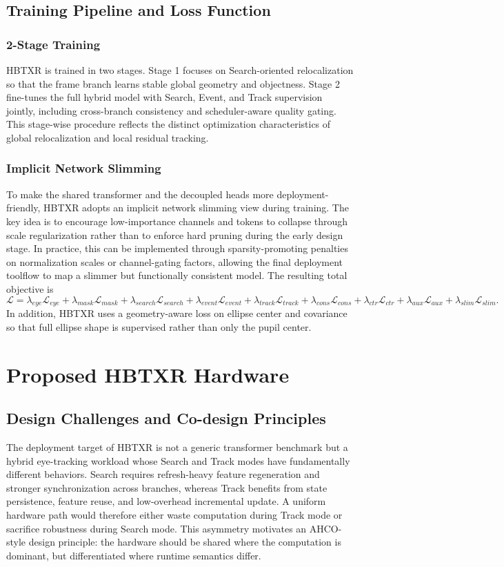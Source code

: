 \documentclass[journal]{IEEEtran}
\begin{document}
\subsection{Training Pipeline and Loss Function}
\subsubsection{2-Stage Training}
HBTXR is trained in two stages. Stage 1 focuses on Search-oriented relocalization so that the frame branch learns stable global geometry and objectness. Stage 2 fine-tunes the full hybrid model with Search, Event, and Track supervision jointly, including cross-branch consistency and scheduler-aware quality gating. This stage-wise procedure reflects the distinct optimization characteristics of global relocalization and local residual tracking.

\subsubsection{Implicit Network Slimming}
To make the shared transformer and the decoupled heads more deployment-friendly, HBTXR adopts an implicit network slimming view during training. The key idea is to encourage low-importance channels and tokens to collapse through scale regularization rather than to enforce hard pruning during the early design stage. In practice, this can be implemented through sparsity-promoting penalties on normalization scales or channel-gating factors, allowing the final deployment toolflow to map a slimmer but functionally consistent model. The resulting total objective is
\begin{equation}
\mathcal{L}=\lambda_{eye}\mathcal{L}_{eye}+\lambda_{mask}\mathcal{L}_{mask}+\lambda_{search}\mathcal{L}_{search}+\lambda_{event}\mathcal{L}_{event}+\lambda_{track}\mathcal{L}_{track}+\lambda_{cons}\mathcal{L}_{cons}+\lambda_{ctr}\mathcal{L}_{ctr}+\lambda_{aux}\mathcal{L}_{aux}+\lambda_{slim}\mathcal{L}_{slim}.
\end{equation}
In addition, HBTXR uses a geometry-aware loss on ellipse center and covariance so that full ellipse shape is supervised rather than only the pupil center.

\section{Proposed HBTXR Hardware}
\subsection{Design Challenges and Co-design Principles}
The deployment target of HBTXR is not a generic transformer benchmark but a hybrid eye-tracking workload whose Search and Track modes have fundamentally different behaviors. Search requires refresh-heavy feature regeneration and stronger synchronization across branches, whereas Track benefits from state persistence, feature reuse, and low-overhead incremental update. A uniform hardware path would therefore either waste computation during Track mode or sacrifice robustness during Search mode. This asymmetry motivates an AHCO-style design principle: the hardware should be shared where the computation is dominant, but differentiated where runtime semantics differ.
\end{document}
